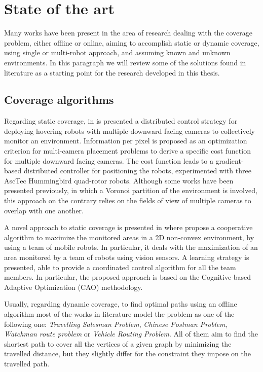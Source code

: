 \section{State of the art}

Many works have been present in the area of research dealing with the coverage problem, either offline or online, aiming to accomplish static or dynamic coverage, using single or multi-robot approach, and assuming known and unknown environments. In this paragraph we will review some of the solutions found in literature as a starting point for the research developed in this thesis.


\subsection{Coverage algorithms}

Regarding static coverage, in \cite{5152815} is presented a distributed control strategy for deploying hovering robots with multiple downward facing cameras to collectively monitor an environment. Information per pixel is proposed as an optimization criterion for multi-camera placement problems  to derive a specific cost function for multiple downward facing cameras. The cost function leads to a gradient-based distributed controller for positioning the robots, experimented with three AscTec Hummingbird quad-rotor robots. Although some works have been presented previously, in which a Voronoi partition of the environment is involved, this approach on the contrary relies on the fields of view of multiple cameras to overlap with one another.

A novel approach to static coverage is presented in \cite{5649249} where propose a cooperative algorithm to maximize the monitored areas in a 2D non-convex environment, by using a team of mobile robots. In particular, it deals with the maximization of an area monitored by a team of robots using vision sensors. A learning strategy is presented, able to provide a coordinated control algorithm for all the team members. In particular, the proposed approach is based on the Cognitive-based Adaptive Optimization (CAO) methodology.

Usually, regarding dynamic coverage, to find optimal paths using an offline algorithm most of the works in literature model the problem as one of the following one: \emph{Travelling Salesman Problem}, \emph{Chinese Postman Problem}, \emph{Watchman route problem} or \emph{Vehicle Routing Problem}. All of them aim to find the shortest path to cover all the vertices of a given graph by minimizing the travelled distance, but they slightly differ for the constraint they impose on the travelled path.

